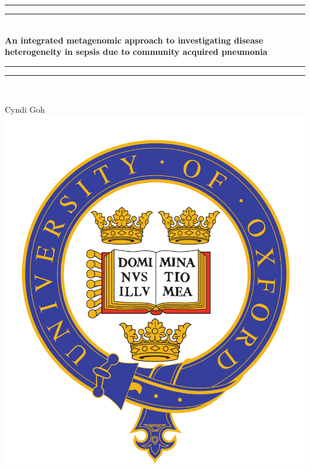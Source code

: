 \begin{titlepage}
\vspace*{10mm}
	\begin{center}
		\rule[0.5ex]{\linewidth}{2pt}\vspace*{-\baselineskip}\vspace*{3.2pt}
		\rule[0.5ex]{\linewidth}{1pt}\\[\baselineskip]

{\LARGE{\textbf{An integrated metagenomic approach to investigating disease heterogeneity in sepsis due to community acquired pneumonia}}}\\[4mm]

\rule[0.5ex]{\linewidth}{1pt}\vspace*{-\baselineskip}\vspace{3.2pt}
\rule[0.5ex]{\linewidth}{2pt}\\
\vspace{20mm}

{\Large Cyndi Goh}\\

\vspace{6mm}
\includegraphics[scale=0.3]{./oxford_logo-eps-converted-to.pdf}\\
\vspace{6mm}


\end{center}
\end{titlepage}
